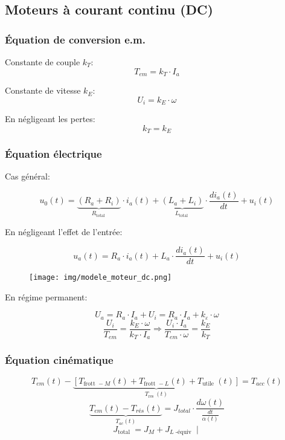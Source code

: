 \documentclass[10pt]{article} %
\begin{document}
\begin{multicols}{3}
		\subsection*{Moteurs à courant continu (DC)}
		
			\subsubsection*{Équation de conversion e.m.}
			
				Constante de couple $k_T$:
				\[T_{e m}=k_{T} \cdot I_{a}\]
				
				Constante de vitesse $k_E$:
				\[U_{i}=k_{E} \cdot \omega\]
				
				En négligeant les pertes:
				\[k_{T}=k_{E}\]
			
			\subsubsection*{Équation électrique}
			
				Cas général:
			
				\[u_{0}(t)=\underbrace{\left(R_{a}+R_{i}\right)}_{R_{\text {total }}} \cdot i_{a}(t)+\underbrace{\left(L_{a}+L_{i}\right)}_{L_{\text {total }}} \cdot \frac{d i_{a}(t)}{d t}+u_{i}(t)\]
				
				En négligeant l'effet de l'entrée:
				
				\[u_{a}(t)=R_{a} \cdot i_{a}(t)+L_{a} \cdot \frac{d i_{a}(t)}{d t}+u_{i}(t)\]
				
				\begin{figure}[H]
					\texttt{[image: img/modele\_moteur\_dc.png]}
					\centering
				\end{figure}
				
				En régime permanent:
				
				\[U_{a}=R_{a} \cdot I_{a}+U_{i}=R_{a} \cdot I_{a}+k_{\varepsilon} \cdot \omega\]
				\[\frac{U_{i}}{T_{e m}}=\frac{k_{E} \cdot \omega}{k_{T} \cdot I_{a}} \Rightarrow \frac{U_{i} \cdot I_{a}}{T_{e m} \cdot \omega}=\frac{k_{E}}{k_{T}}\]
				
			\subsubsection*{Équation cinématique}
				
				\[T_{e m}(t)-\underbrace{\left[T_{\text {frott }-M}(t)+T_{\text {frott }-L}(t)+T_{\text {utile }}(t)\right]}_{T_{\text {res }}(t)}=T_{a c c}(t)\]
				\[\underbrace{T_{e m}(t)-T_{r é s}(t)}_{T_{a c}(t)}=J_{t o t a l} \cdot \frac{d \omega(t)}{\frac{d t}{\alpha(t)}}\]
				\[J_{\text {total }}=J_{M}+J_{L \text { -équiv }} \mid\]
				

\end{multicols}
\end{document}
